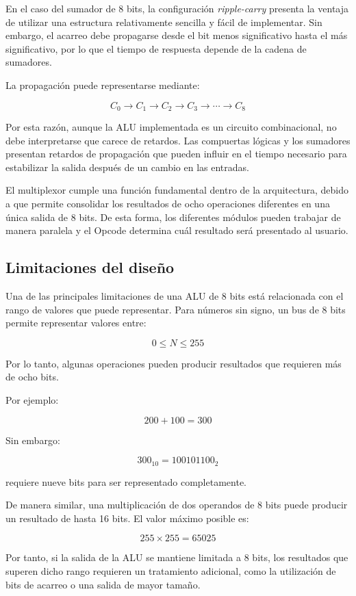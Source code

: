\documentclass[12pt,a4paper]{article}
\begin{document}
En el caso del sumador de 8 bits, la configuración \textit{ripple-carry} presenta la ventaja de utilizar una estructura relativamente sencilla y fácil de implementar. Sin embargo, el acarreo debe propagarse desde el bit menos significativo hasta el más significativo, por lo que el tiempo de respuesta depende de la cadena de sumadores.

La propagación puede representarse mediante:

\[
C_0 \rightarrow C_1 \rightarrow C_2 \rightarrow C_3
\rightarrow \cdots \rightarrow C_8
\]

Por esta razón, aunque la ALU implementada es un circuito combinacional, no debe interpretarse que carece de retardos. Las compuertas lógicas y los sumadores presentan retardos de propagación que pueden influir en el tiempo necesario para estabilizar la salida después de un cambio en las entradas.

El multiplexor cumple una función fundamental dentro de la arquitectura, debido a que permite consolidar los resultados de ocho operaciones diferentes en una única salida de 8 bits. De esta forma, los diferentes módulos pueden trabajar de manera paralela y el Opcode determina cuál resultado será presentado al usuario.

\subsection{Limitaciones del diseño}

Una de las principales limitaciones de una ALU de 8 bits está relacionada con el rango de valores que puede representar. Para números sin signo, un bus de 8 bits permite representar valores entre:

\[
0 \leq N \leq 255
\]

Por lo tanto, algunas operaciones pueden producir resultados que requieren más de ocho bits.

Por ejemplo:

\[
200+100=300
\]

Sin embargo:

\[
300_{10}=100101100_2
\]

requiere nueve bits para ser representado completamente.

De manera similar, una multiplicación de dos operandos de 8 bits puede producir un resultado de hasta 16 bits. El valor máximo posible es:

\[
255\times255=65025
\]

Por tanto, si la salida de la ALU se mantiene limitada a 8 bits, los resultados que superen dicho rango requieren un tratamiento adicional, como la utilización de bits de acarreo o una salida de mayor tamaño.
\end{document}
